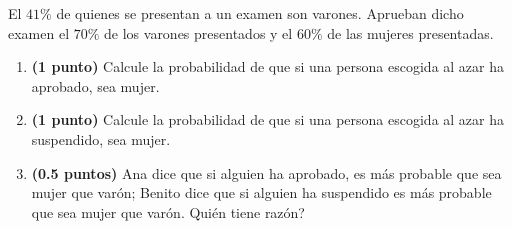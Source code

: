 
El $41\%$ de quienes se presentan a un examen son varones. Aprueban dicho examen el $70\%$ de los varones presentados y el $60\%$ de las mujeres presentadas.
\begin{enumerate}[label=\alph*)]
\item \textbf{(1 punto)} Calcule la probabilidad de que si una persona escogida al azar ha aprobado, sea mujer.
\item \textbf{(1 punto)} Calcule la probabilidad de que si una persona escogida al azar ha suspendido, sea mujer.
\item \textbf{(0.5 puntos)} Ana dice que si alguien ha aprobado, es más probable que sea mujer que varón; Benito dice que si alguien ha suspendido es más probable que sea mujer que varón. \textquestiondown{}Quién tiene razón?
\end{enumerate}
